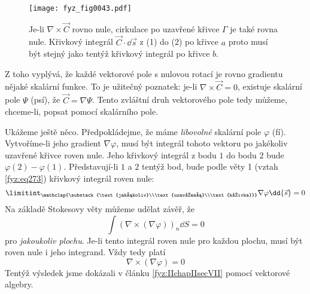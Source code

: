       \begin{figure}[ht!]  %
        \centering
        \texttt{[image: fyz\_fig0043.pdf]}
        \caption{Je-li \(\nabla\times\vec{C}\) rovno nule, cirkulace po uzavřené křivce \(\Gamma\)   
          je také rovna nule. Křivkový integrál \(\vec{C}\cdot\dd{\vec{s}}\) z (1) do (2) po 
          křivce \(a\) proto musí být stejný jako tentýž křivkový integrál po křivce \(b\).}
        \label{fyz:fig0043}
      \end{figure}
      Z toho vyplývá, že každé vektorové pole s nulovou rotací je rovno gradientu nějaké skalární 
      funkce. To je užitečný poznatek: je-li \(\nabla\times\vec{C}=0\), existuje skalární pole 
      \(\Psi\) (psí), že \(\vec{C}=\nabla\Psi\). Tento zvláštní druh vektorového pole tedy můžeme, 
      chceme-li, popsat pomocí skalárního pole.
      
      Ukážeme ještě něco. Předpokládejme, že máme \emph{libovolné} skalární pole \(\varphi\) (fí). 
      Vytvoříme-li jeho gradient \(\nabla\varphi\), musí být integrál tohoto vektoru po jakékoliv 
      uzavřené křivce  roven nule. Jeho křivkový integrál z bodu \(1\) do bodu \(2\) bude 
      \(\varphi(2) - \varphi(1)\). Představují-li \(1\) a \(2\) tentýž bod, bude podle věty 1 (vztah 
      \ref{fyz:eq273}) křivkový integrál roven nule:
      \begin{equation}\label{fyz:eq359}
        \limitint_{\mathclap{\substack{\text{jakákoliv}\\\text{uzavřená}\\\text{křivka}}}}
          \nabla\varphi\dd{\vec{s}} = 0
      \end{equation}
      Na základě Stokesovy věty můžeme udělat závěř, že 
      \begin{equation}\label{fyz:eq_fey_null0} 
        \int(\nabla\times(\nabla\varphi))_n\dd{S} = 0
      \end{equation} 
      pro \emph{jakoukoliv plochu}. Je-li tento integrál roven nule pro každou plochu, musí být 
      roven nule i jeho integrand. Vždy tedy platí
      \begin{equation}
        \nabla\times(\nabla\varphi) = 0
      \end{equation}
      Tentýž výsledek jsme dokázali v článku \ref{fyz:IIchapIIsecVII} pomocí vektorové algebry.      
      
